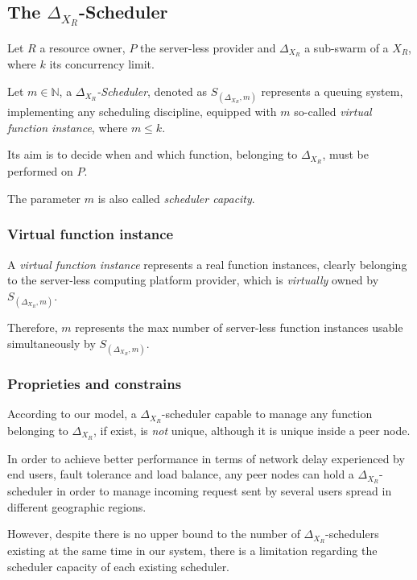 \documentclass[10pt,a4paper]{article}
\begin{document}
\subsection{The $\Delta_{X_{R}}$-Scheduler}

Let $R$ a resource owner, $P$ the server-less provider and $\Delta_{X_{R}}$ a sub-swarm of a $X_{R}$, where $k$ its concurrency limit.

Let $m \in \mathbb{N}$, a \textit{$\Delta_{X_{R}}$-Scheduler}, denoted as $S_{(\Delta_{X_{R}},m)}$ represents a queuing system, implementing any scheduling discipline, equipped with $m$ so-called \textit{virtual function instance}, where $m \leq k$.

Its aim is to decide when and which function, belonging to $\Delta_{X_{R}}$, must be performed on $P$. 

The parameter $m$ is also called \textit{scheduler capacity}.

\subsubsection{Virtual function instance}

A \textit{virtual function instance} represents a real function instances, clearly belonging to the server-less computing platform provider, which is \textit{virtually} owned by $S_{(\Delta_{X_{R}},m)}$.

Therefore, $m$ represents the max number of server-less function instances usable simultaneously by $S_{(\Delta_{X_{R}},m)}$.

\subsubsection{Proprieties and constrains}

According to our model, a $\Delta_{X_{R}}$-scheduler capable to manage any function belonging to $\Delta_{X_{R}}$, if exist, is \textit{not} unique, although it is unique inside a peer node. 

In order to achieve better performance in terms of network delay experienced by end users, fault tolerance and load balance, any peer nodes can hold a $\Delta_{X_{R}}$-scheduler in order to manage incoming request sent by several users spread in different geographic regions. 

However, despite there is no upper bound to the number of $\Delta_{X_{R}}$-schedulers existing at the same time in our system, there is a limitation regarding the scheduler capacity of each existing scheduler. 
\end{document}
